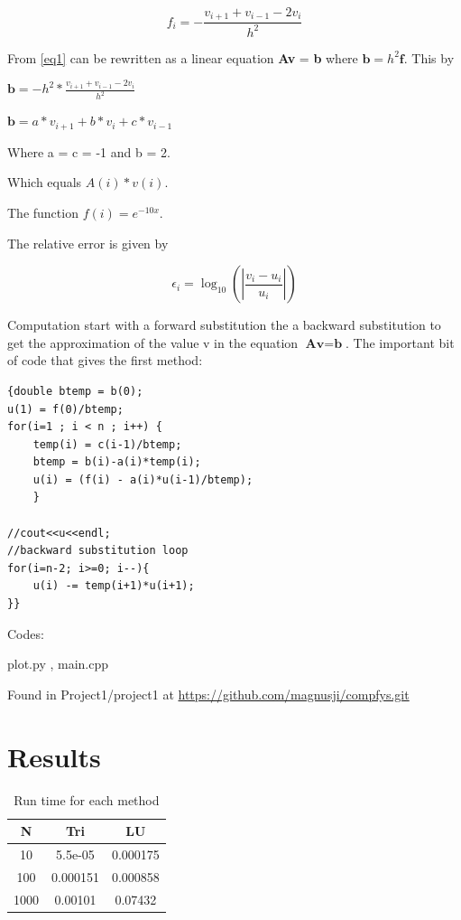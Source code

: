 \documentclass[12pt]{article}
\begin{document}
\begin{equation}
f_i = -\frac{v_{i+1} +v_{i-1} -2v_i}{h^2}
\label{eq1}
\end{equation}

From \ref{eq1} can be rewritten as a linear equation \textbf{Av} = \textbf{b} where $\textbf{b} = h^2\textbf{f}$. This by 

$\textbf{b} = -h^2*\frac{v_{i+1} +v_{i-1} -2v_i}{h^2}$

$\textbf{b} = a*v_{i+1} + b*v_i + c*v_{i-1}$

Where a = c = -1 and b = 2.

Which equals $A(i)*v(i)$.

The function $f(i) = e^{-10x}$.

The relative error is given by 

\begin{equation}
\epsilon_i = \log_{10}(|\frac{v_i - u_i}{u_i}|)
\label{eq:rel}
\end{equation}

Computation start with a forward substitution the a backward substitution to get the approximation of the value v in the equation $\textbf{Av} = \textbf{b}$.  The important bit of code that gives the first method:  
 
\begin{lstlisting}
{double btemp = b(0);
u(1) = f(0)/btemp;
for(i=1 ; i < n ; i++) {
    temp(i) = c(i-1)/btemp;
    btemp = b(i)-a(i)*temp(i);
    u(i) = (f(i) - a(i)*u(i-1)/btemp);
    }

//cout<<u<<endl;
//backward substitution loop
for(i=n-2; i>=0; i--){
    u(i) -= temp(i+1)*u(i+1);
}}
\end{lstlisting} 




Codes: 

plot.py , main.cpp

Found in Project1/project1 at \url{https://github.com/magnusji/compfys.git}


\section*{Results}

\begin{table}[hb!]
\centering
\caption{Run time for each method}
\begin{tabular}{c|c|c|}
N & Tri & LU \\
\hline
10 & 5.5e-05 & 0.000175 \\
100 & 0.000151 & 0.000858 \\
1000 & 0.00101 & 0.07432\\

\end{tabular}
\label{tab:time}
\end{table}
\end{document}

